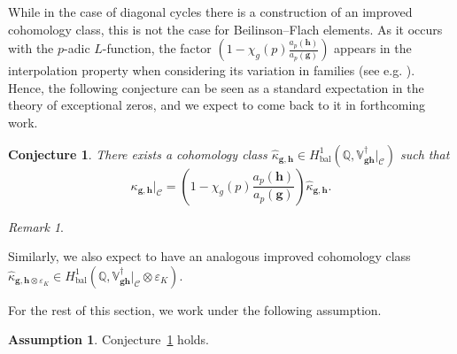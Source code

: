 \documentclass[a4paper,11pt]{amsart}
\theoremstyle{plain}
\newtheorem{conj}[theorem]{Conjecture}
\theoremstyle{definition}
\newtheorem{ass}[theorem]{Assumption}
\theoremstyle{remark}
\newtheorem{remarkwr}[theorem]{Remark}
\newenvironment{remark}{\begin{remarkwr}\begin{upshape}}{\end{upshape}\end{remarkwr}}
\newcommand{\bb}{\mathbb}
\newcommand{\cl}{\mathcal}
\DeclareMathOperator{\bal}{bal}
\DeclareMathOperator{\Eis}{Eis}
\newcommand{\hg}{{\mathbf{g}}}
\newcommand{\hh}{{\mathbf h}}
\numberwithin{equation}{section}
\begin{document}
While in the case of diagonal cycles there is a construction of an improved cohomology class, this is not the case for Beilinson--Flach elements. As it occurs with the $p$-adic $L$-function, the factor $\left( 1 - \chi_g(p)\frac{a_p(\hh)}{a_p(\hg)} \right)$ appears in the interpolation property when considering its variation in families (see e.g. \cite[\S8]{KLZ}). Hence, the following conjecture can be seen as a standard expectation in the theory of exceptional zeros, and we expect to come back to it in forthcoming work.

\begin{conj}\label{conj:improvedbeilinsonclass}
There exists a cohomology class $\widehat{\kappa}_{\hg,\hh}\in H^1_{\bal}(\bb{Q},\bb{V}_{\hg\hh}^\dagger\vert_{\cl{C}})$ such that
\[
\kappa_{\hg,\hh}\vert_{\cl{C}} = \left( 1 - \chi_g(p)\frac{a_p(\hh)}{a_p(\hg)} \right) \widehat{\kappa}_{\hg,\hh}.
\]
\end{conj}

\begin{remark}
    Similarly, we also expect to have an analogous improved cohomology class $\widehat{\kappa}_{\hg,\hh\otimes\varepsilon_K} \in H^1_{\bal}(\bb{Q},\bb{V}_{\hg\hh}^\dagger\vert_{\cl{C}}\otimes\varepsilon_K)$.
\end{remark}

For the rest of this section, we work under the following assumption.

\begin{ass}
    Conjecture~\ref{conj:improvedbeilinsonclass} holds.
\end{ass}
\end{document}
